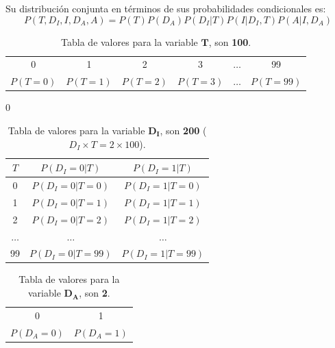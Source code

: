 \documentclass[12pt]{article}
\begin{document}
  Su distribución conjunta en términos de sus probabilidades condicionales es:
  \begin{equation}
  P(T,D_I,I,D_A,A)=P(T)P(D_A)P(D_I|T)P(I|D_I,T)P(A|I,D_A)
  \end{equation}
\begin{table}[h!]
	\centering
	\begin{tabular}{|c|c|c|c|c|c|}
		\hline
		\rowcolor[gray]{.8}
		\multicolumn{6}{|c|}{$P(T)$} \\\hline %
		\rowcolor[gray]{.8}
		0 & 1 & 2 & 3 & $\dots$ & 99\\\hline
		$P(T=0)$ & $P(T=1)$ & $P(T=2)$ & $P(T=3)$ & $\dots$ & $P(T=99)$\\\hline
	\end{tabular}
	\caption{Tabla de valores para la variable $\pmb{T}$, son \textbf{100}.}
	\label{tab:ej1006}0
\end{table}
\begin{table}[h!]
	\centering
	\begin{tabular}{|c|c|c|}
		\hline
		\rowcolor[gray]{.8}
		$T$&$P(D_I=0|T)$&$P(D_I=1|T)$ \\\hline %
		0 & $P(D_I=0|T=0)$ &$P(D_I=1|T=0)$\\\hline
		1 & $P(D_I=0|T=1)$ &$P(D_I=1|T=1)$\\\hline
		2 & $P(D_I=0|T=2)$ &$P(D_I=1|T=2)$\\\hline
		$\dots$ & $\dots$ &$\dots$\\\hline
		99 & $P(D_I=0|T=99)$ &$P(D_I=1|T=99)$\\\hline
	\end{tabular}
	\caption{Tabla de valores para la variable $\pmb{D_I}$, son \textbf{200} ($D_I\times T=2\times 100$).}
	\label{tab:ej1007}
\end{table}
\begin{table}[h!]
	\centering
	\begin{tabular}{|c|c|}
		\hline
		\rowcolor[gray]{.8}
		\multicolumn{2}{|c|}{$P(D_A)$} \\\hline %
		\rowcolor[gray]{.8}
		0 & 1 \\\hline
		$P(D_A=0)$ & $P(D_A=1)$\\\hline
	\end{tabular}
	\caption{Tabla de valores para la variable $\pmb{D_A}$, son \textbf{2}.}
	\label{tab:ej1008}
\end{table}
\end{document}

